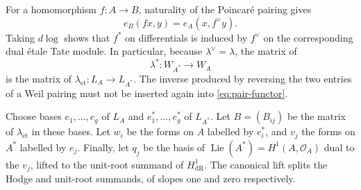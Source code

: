 \documentclass[11pt]{article}
\theoremstyle{definition}\newtheorem{definition}[theorem]{Definition}
\theoremstyle{remark}\newtheorem{remark}[theorem]{Remark}
\newcommand{\OO}{\mathcal O}
\newcommand{\dR}{\mathrm{dR}}
\newcommand{\et}{\mathrm{et}}
\newcommand{\Lie}{\operatorname{Lie}}
\begin{document}
For a homomorphism $f:A\to B$, naturality of the Poincar\'e pairing gives
\begin{equation}\label{eq:pair-functor}
 e_B(fx,y)=e_A(x,f^\vee y).
\end{equation}
Taking $d\log$ shows that $f^*$ on differentials is induced by $f^\vee$ on the corresponding dual \'etale Tate module. In particular, because $\lambda^\vee=\lambda$, the matrix of
\[
 \lambda^*:W_{A^*}\longrightarrow W_A
\]
is the matrix of $\lambda_{\et}:L_A\to L_{A^*}$. The inverse produced by reversing the two entries of a Weil pairing must not be inserted again into \eqref{eq:pair-functor}.

Choose bases $e_1,\ldots,e_g$ of $L_A$ and $e_1^*,\ldots,e_g^*$ of $L_{A^*}$. Let $B=(B_{ij})$ be the matrix of $\lambda_{\et}$ in these bases. Let $w_i$ be the forms on $A$ labelled by $e_i^*$, and $v_j$ the forms on $A^*$ labelled by $e_j$. Finally, let $q_j$ be the basis of $\Lie(A^*)=H^1(A,\OO_A)$ dual to the $v_j$, lifted to the unit-root summand of $H^1_{\dR}$. The canonical lift splits the Hodge and unit-root summands, of slopes one and zero respectively.
\end{document}
